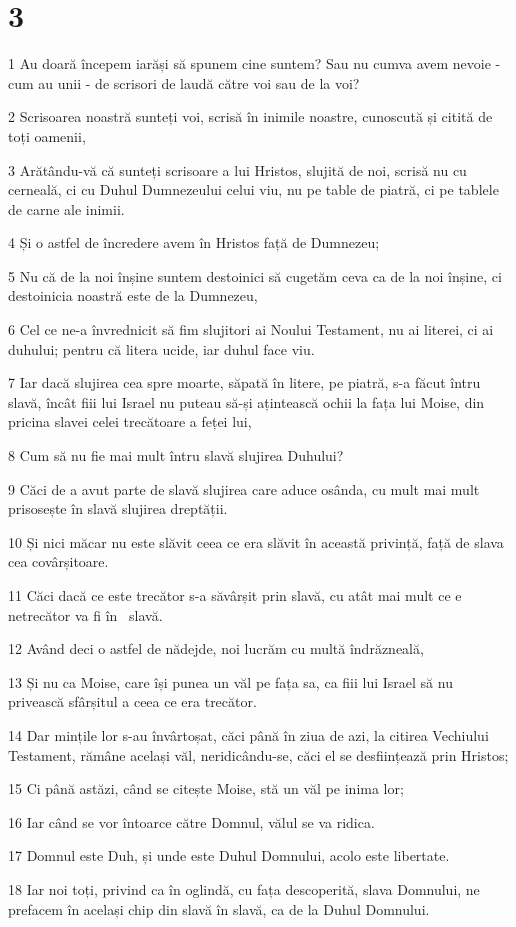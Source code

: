 \chapter{3}

\par 1 Au doară începem iarăși să spunem cine suntem? Sau nu cumva avem nevoie - cum au unii - de scrisori de laudă către voi sau de la voi?
\par 2 Scrisoarea noastră sunteți voi, scrisă în inimile noastre, cunoscută și citită de toți oamenii,
\par 3 Arătându-vă că sunteți scrisoare a lui Hristos, slujită de noi, scrisă nu cu cerneală, ci cu Duhul Dumnezeului celui viu, nu pe table de piatră, ci pe tablele de carne ale inimii.
\par 4 Și o astfel de încredere avem în Hristos față de Dumnezeu;
\par 5 Nu că de la noi înșine suntem destoinici să cugetăm ceva ca de la noi înșine, ci destoinicia noastră este de la Dumnezeu,
\par 6 Cel ce ne-a învrednicit să fim slujitori ai Noului Testament, nu ai literei, ci ai duhului; pentru că litera ucide, iar duhul face viu.
\par 7 Iar dacă slujirea cea spre moarte, săpată în litere, pe piatră, s-a făcut întru slavă, încât fiii lui Israel nu puteau să-și ațintească ochii la fața lui Moise, din pricina slavei celei trecătoare a feței lui,
\par 8 Cum să nu fie mai mult întru slavă slujirea Duhului?
\par 9 Căci de a avut parte de slavă slujirea care aduce osânda, cu mult mai mult prisosește în slavă slujirea dreptății.
\par 10 Și nici măcar nu este slăvit ceea ce era slăvit în această privință, față de slava cea covârșitoare.
\par 11 Căci dacă ce este trecător s-a săvârșit prin slavă, cu atât mai mult ce e netrecător va fi în  slavă.
\par 12 Având deci o astfel de nădejde, noi lucrăm cu multă îndrăzneală,
\par 13 Și nu ca Moise, care își punea un văl pe fața sa, ca fiii lui Israel să nu privească sfârșitul a ceea ce era trecător.
\par 14 Dar mințile lor s-au învârtoșat, căci până în ziua de azi, la citirea Vechiului Testament, rămâne același văl, neridicându-se, căci el se desființează prin Hristos;
\par 15 Ci până astăzi, când se citește Moise, stă un văl pe inima lor;
\par 16 Iar când se vor întoarce către Domnul, vălul se va ridica.
\par 17 Domnul este Duh, și unde este Duhul Domnului, acolo este libertate.
\par 18 Iar noi toți, privind ca în oglindă, cu fața descoperită, slava Domnului, ne prefacem în același chip din slavă în slavă, ca de la Duhul Domnului.

